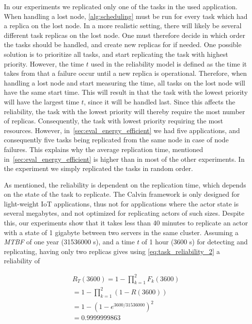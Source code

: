 \documentclass{cslthse-msc}
\begin{document}
In our experiments we replicated only one of the tasks in the used application. When handling a lost node, \cref{alg:scheduling} must be run for every task which had a replica on the lost node. In a more realistic setting, there will likely be several different task replicas on the lost node. One must therefore decide in which order the tasks should be handled, and create new replicas for if needed. One possible solution is to prioritize all tasks, and start replicating the task with highest priority. However, the time $t$ used in the reliability model is defined as the time it takes from that a failure occur until a new replica is operational. Therefore, when handling a lost node and start measuring the time, all tasks on the lost node will have the same start time. This will result in that the task with the lowest priority will have the largest time $t$, since it will be handled last. Since this affects the reliability, the task with the lowest priority will thereby require the most number of replicas. Consequently, the task with lowest priority requiring the most resources. However, in~\cref{sec:eval_energy_efficient} we had five applications, and consequently five tasks being replicated from the same node in case of node failures. This explains why the average replication time, mentioned in~\cref{sec:eval_energy_efficient} is higher than in most of the other experiments. In the experiment we simply replicated the tasks in random order.

As mentioned, the reliability is dependent on the replication time, which depends on the state of the task to replicate. The Calvin framework is only designed for light-weight IoT applications, thus not for applications where the actor state is several megabytes, and not optimized for replicating actors of such sizes. Despite this, our experiments show that it takes less than 40 minutes to replicate an actor with a state of 1 gigabyte between two servers in the same cluster. Assuming a \emph{MTBF} of one year (31536000 s), and a time $t$ of 1 hour (3600 s) for detecting and replicating, having only two replicas gives using \cref{eq:task_reliability_2} a reliability of

\begin{equation*}
\begin{split}
R_{T}(3600) = 1 - \prod\limits_{k=1}^2 F_{k}(3600)\\
= 1 - \prod\limits_{k=1}^2 (1 - R(3600))\\
= 1 - (1 - e^{3600/31536000})^2\\
= 0.9999999863
\end{split}
\end{equation*}
\end{document}
